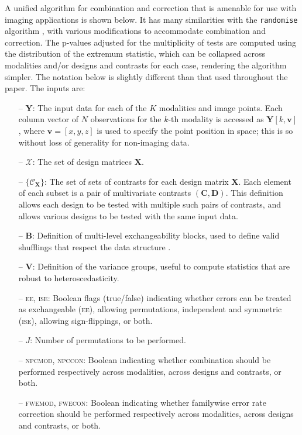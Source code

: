 \label{sec:comb:implementation}

A unified algorithm for combination and correction that is amenable for use with imaging applications is shown below. It has many similarities with the \texttt{randomise} algorithm \citep{Winkler2014}, with various modifications to accommodate combination and correction. The p-values adjusted for the multiplicity of tests are computed using the distribution of the extremum statistic, which can be collapsed across modalities and/or designs and contrasts for each case, rendering the algorithm simpler. The notation below is slightly different than that used throughout the paper. The inputs are:

\begin{itemize}[leftmargin=*]
\item[--] $\mathbf{Y}$: The input data for each of the $K$ modalities and image points. Each column vector of $N$ observations for the $k$-th modality is accessed as $\mathbf{Y}[k,\mathbf{v}]$, where $\mathbf{v}=[x, y, z]$ is used to specify the point position in space; this is so without loss of generality for non-imaging data.
\item[--] $\mathcal{X}$:  The set of design matrices $\mathbf{X}$.
\item[--] $\{\mathcal{C}_\mathbf{X}\}$: The set of sets of contrasts for each design matrix $\mathbf{X}$. Each element of each subset is a pair of multivariate contrasts $(\mathbf{C},\mathbf{D})$. This definition allows each design to be tested with multiple such pairs of contrasts, and allows various designs to be tested with the same input data.
\item[--] $\mathbf{B}$: Definition of multi-level exchangeability blocks, used to define valid shufflings that respect the data structure \citep{Winkler2015}.
\item[--] $\mathbf{V}$: Definition of the variance groups, useful to compute statistics that are robust to heteroscedasticity.
\item[--] \textsc{ee}, \textsc{ise}: Boolean flags (true/false) indicating whether errors can be treated as exchangeable (\textsc{ee}), allowing permutations, independent and symmetric (\textsc{ise}), allowing sign-flippings, or both.
\item[--] $J$: Number of permutations to be performed.
\item[--] \textsc{npcmod}, \textsc{npccon}: Boolean indicating whether combination should be performed respectively across modalities, across designs and contrasts, or both.
\item[--] \textsc{fwemod}, \textsc{fwecon}: Boolean indicating whether familywise error rate correction should be performed respectively across modalities, across designs and contrasts, or both.
\end{itemize}

